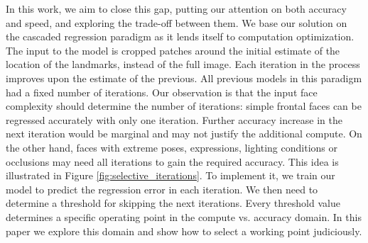 \documentclass[twocolumn]{article}
\begin{document}
In this work, we aim to close this gap, putting our attention on both accuracy and speed, and exploring the trade-off between them. We base our solution on the cascaded regression paradigm as it lends itself to computation optimization. The input to the model is cropped patches around the initial estimate of the location of the landmarks, instead of the full image. Each iteration in the process improves upon the estimate of the previous. All previous models in this paradigm had a fixed number of iterations. Our observation is that the input face complexity should determine the number of iterations: simple frontal faces can be regressed accurately with only one iteration.
Further accuracy increase in the next iteration would be marginal and may not justify the additional compute. On the other hand, faces with extreme poses, expressions, lighting conditions or occlusions may need all iterations to gain the required accuracy. This idea is illustrated in Figure \ref{fig:selective_iterations}. To implement it, we train our model to predict the regression error in each iteration. We then need to determine a threshold for skipping the next iterations. Every threshold value determines a specific operating point in the compute vs. accuracy domain. In this paper we explore this domain and show how to select a working point judiciously.
\end{document}
